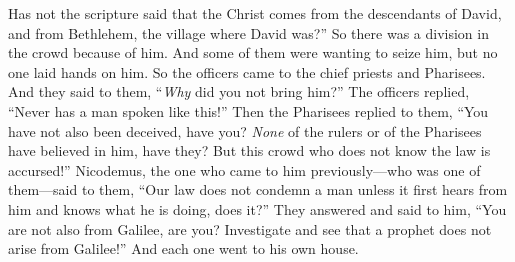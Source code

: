 \begin{biblechapter}
\verse Has not the scripture said that the Christ comes from the descendants of David, and from Bethlehem, the village where David was?”
\verse So there was a division in the crowd because of him.
\verse And some of them were wanting to seize him, but no one laid hands on him.
\verse So the officers came to the chief priests and Pharisees. And they said to them, “\textit{Why} did you not bring him?”
\verse The officers replied, “Never has a man spoken like this!”
\verse Then the Pharisees replied to them, “You have not also been deceived, have you?
\verse \textit{None} of the rulers or of the Pharisees have believed in him, have they?
\verse But this crowd who does not know the law is accursed!”
\verse Nicodemus, the one who came to him previously—who was one of them—said to them,
\verse “Our law does not condemn a man unless it first hears from him and knows what he is doing, does it?”
\verse They answered and said to him, “You are not also from Galilee, are you? Investigate and see that a prophet does not arise from Galilee!”
\verse And each one went to his own house.
\end{biblechapter}

